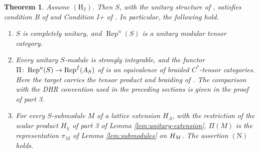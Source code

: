 \documentclass[leqno]{article}
\let\cal\relax
\newcommand{\cal}{\mathcal}
\newcommand{\co}{\colon}
\DeclareMathOperator{\Rep}{Rep} %
\newtheorem{thm}{Theorem}[section]
\numberwithin{equation}{section}
\begin{document}
\begin{thm}
\label{thm:S-cu}
Assume $\mathrm{(H_J)}$. Then $S$, with the unitary structure of \cite[Theorem 10.10]{Arh26}, satisfies condition B of \cite[Section 3.4 p.~44]{Gui26} and Condition I+ of \cite[Definition 6.17 p.~70]{Gui25}. In particular, the following hold.
\begin{enumerate}
\item $S$ is completely unitary, and $\Rep^u(S)$ is a unitary modular tensor category.
\item Every unitary $S$-module is strongly integrable, and the functor $\Pi \co \Rep^u(S) \to \Rep^f(\cal A_S)$ of \cite[Section 3.4 p.~45]{Gui26} is an equivalence of braided $C^*$-tensor categories. Here the target carries the tensor product and braiding of \cite{Gui26}. The comparison with the DHR convention used in the preceding sections is given in the proof of part 3.
\item For every $S$-submodule $M$ of a lattice extension $H_\Lambda$, with the restriction of the scalar product $H_\chi$ of part 3 of Lemma \ref{lem:unitary-extension}, $\Pi(M)$ is the representation $\pi_M$ of Lemma \ref{lem:submodules} on $\cal H_M$. The assertion $\mathrm{(N)}$ holds.
\end{enumerate}
\end{thm}
\end{document}
